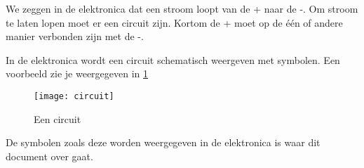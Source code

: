 We zeggen in de elektronica dat een stroom loopt van de + naar de -. Om stroom te laten lopen moet er een circuit zijn. Kortom de + moet op de \'e\'en of andere manier verbonden zijn met de -.

In de elektronica wordt een circuit schematisch weergeven met symbolen. Een voorbeeld zie je weergegeven in \ref{symbool:circuit}

\begin{figure}[h]
\texttt{[image: circuit]}
\centering
\caption{Een circuit}
\label{symbool:circuit}
\end{figure}

De symbolen zoals deze worden weergegeven in de elektronica is waar dit document over gaat.

